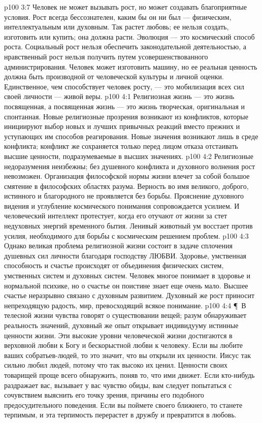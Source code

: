 \vs p100 3:7 Человек не может вызывать рост, но может создавать благоприятные условия. Рост всегда бессознателен, каким бы он ни был --- физическим, интеллектуальным или духовным. Так растет любовь; ее нельзя создать, изготовить или купить; она должна расти. Эволюция --- это космический способ роста. Социальный рост нельзя обеспечить законодательной деятельностью, а нравственный рост нельзя получить путем усовершенствованного администрирования. Человек может изготовить машину, но ее реальная ценность должна быть производной от человеческой культуры и личной оценки. Единственное, чем способствует человек росту, --- это мобилизация всех сил своей личности --- живой веры.
\vs p100 4:1 Религиозная жизнь --- это жизнь посвященная, а посвященная жизнь --- это жизнь творческая, оригинальная и спонтанная. Новые религиозные прозрения возникают из конфликтов, которые инициируют выбор новых и лучших привычных реакций вместо прежних и уступающих им способов реагирования. Новые значения возникают лишь в среде конфликта; конфликт же сохраняется только перед лицом отказа отстаивать высшие ценности, подразумеваемые в высших значениях.
\vs p100 4:2 Религиозные недоразумения неизбежны; без душевного конфликта и духовного волнения рост невозможен. Организация философской нормы жизни влечет за собой большое смятение в философских областях разума. Верность во имя великого, доброго, истинного и благородного не проявляется без борьбы. Прояснение духовного видения и углубление космического понимания сопровождается усилием. И человеческий интеллект протестует, когда его отучают от жизни за стет недуховных энергий временного бытия. Ленивый животный ум восстает против усилия, необходимого для борьбы с космическим решением проблем.
\vs p100 4:3 Однако великая проблема религиозной жизни состоит в задаче сплочения душевных сил личности благодаря господству ЛЮБВИ. Здоровье, умственная способность и счастье происходят от объединения физических систем, умственных систем и духовных систем. Человек многое понимает в здоровье и нормальной психике, но о счастье он поистине знает еще очень мало. Высшее счастье неразрывно связано с духовным развитием. Духовный же рост приносит непреходящую радость, мир, превосходящий всякое понимание.
\vs p100 4:4 \P\ В телесной жизни чувства говорят о существовании вещей; разум обнаруживает реальность значений, духовный же опыт открывает индивидууму истинные ценности жизни. Эти высокие уровни человеческой жизни достигаются в верховной любви к Богу и бескорыстной любви к человеку. Если вы любите ваших собратьев\hyp{}людей, то это значит, что вы открыли их ценности. Иисус так сильно любил людей, потому что так высоко их ценил. Ценности своих товарищей проще всего обнаружить, поняв то, что ими движет. Если кто\hyp{}нибудь раздражает вас, вызывает у вас чувство обиды, вам следует попытаться с сочувствием выяснить его точку зрения, причины его подобного предосудительного поведения. Если вы поймете своего ближнего, то станете терпимым, и эта терпимость перерастет в дружбу и превратится в любовь.
